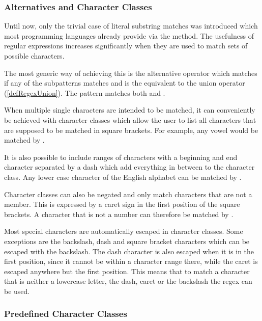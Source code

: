 \subsubsection{Alternatives and Character Classes} \label{sec:introAltAndCharClasses}

Until now, only the trivial case of literal substring matches was introduced which most programming languages already provide via the  method. The usefulness of regular expressions increases significantly when they are used to match sets of possible characters.

The most generic way of achieving this is the alternative operator  which matches if any of the subpatterns  matches and is the equivalent to the union operator (\ref{defRegexUnion}). The pattern  matches both  and . 

When multiple single characters are intended to be matched, it can conveniently be achieved with character classes which allow the user to list all characters that are supposed to be matched in square brackets. For example, any vowel would be matched by \pattern{[aeiou]}. 

It is also possible to include ranges of characters with a beginning and end character separated by a dash which add everything in between to the character class. Any lower case character of the English alphabet can be matched by \pattern{[a-z]}.

Character classes can also be negated and only match characters that are not a member. This is expressed by a caret sign in the first position of the square brackets. A character that is not a number can therefore be matched by \pattern{[\caret 0-9]}.

Most special characters are automatically escaped in character classes. Some exceptions are the backslash, dash and square bracket characters which can be escaped with the backslash. The dash character is also escaped when it is in the first position, since it cannot be within a character range there, while the caret is escaped anywhere but the first position. This means that to match a character that is neither a lowercase letter, the dash, caret or the backslash the regex  can be used.

\subsubsection{Predefined Character Classes}

